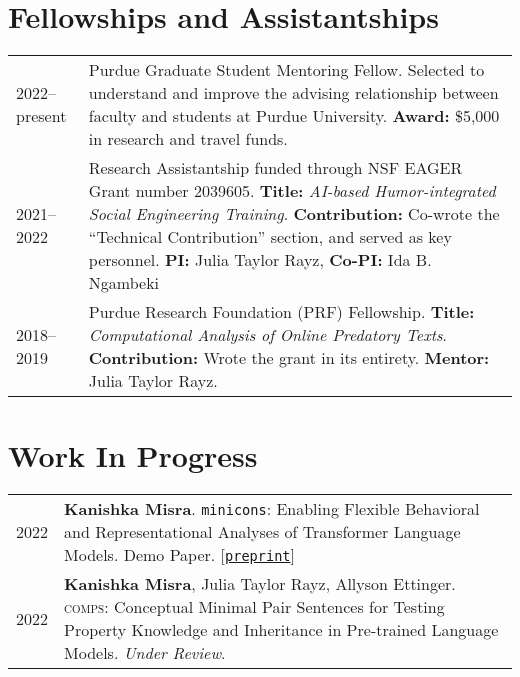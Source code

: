 \documentclass[11pt]{article}
\newcommand{\preprint}[1]{[\href{#1}{\texttt{preprint}}]}
\begin{document}
\section*{Fellowships and Assistantships}
\vspace{-.5em}
\renewcommand*{\arraystretch}{1.5}
\begin{tabularx}{\textwidth}{@{}p{} X}
2022--present & Purdue Graduate Student Mentoring Fellow. Selected to understand and improve the advising relationship between faculty and students at Purdue University. \textbf{Award:} \$5{,}000 in research and travel funds.\\
2021--2022 & Research Assistantship funded through NSF EAGER Grant number 2039605. \textbf{Title:} \emph{AI-based Humor-integrated Social Engineering Training}. \textbf{Contribution:} Co-wrote the ``Technical Contribution'' section, and served as key personnel. \textbf{PI:} Julia Taylor Rayz, \textbf{Co-PI:} Ida B. Ngambeki \\
2018--2019 & Purdue Research Foundation (PRF) Fellowship. \textbf{Title:} \textit{Computational Analysis of Online Predatory Texts}. \textbf{Contribution:} Wrote the grant in its entirety. \textbf{Mentor:} Julia Taylor Rayz.\\
\end{tabularx}

\section*{Work In Progress}
\vspace{-1.5em}
\renewcommand*{\arraystretch}{1.5}
\begin{longtable}{p{}  p{} }
2022 & \textbf{Kanishka Misra}. \texttt{minicons}: Enabling Flexible Behavioral and Representational Analyses of Transformer Language Models. Demo Paper. \preprint{https://arxiv.org/abs/2203.13112}\\
2022 & \textbf{Kanishka Misra}, Julia Taylor Rayz, Allyson Ettinger. \textsc{comps}: Conceptual Minimal Pair Sentences for Testing Property Knowledge and Inheritance in Pre-trained Language Models. \textit{Under Review}.
\end{longtable}
\end{document}
